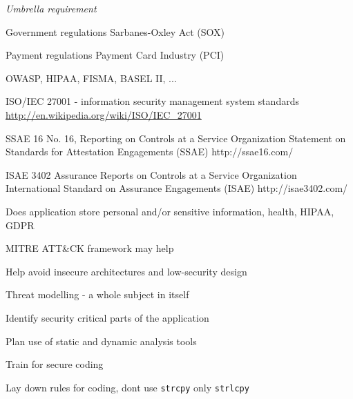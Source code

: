 \documentclass[Screen16to9,17pt]{foils}
\begin{document}
\begin{list2}
\item \emph{Umbrella requirement}
\item Government regulations Sarbanes-Oxley Act (SOX)
\item Payment regulations Payment Card Industry (PCI)
\item OWASP, HIPAA, FISMA, BASEL II, ...
\item ISO/IEC 27001 - information security management system standards
\url{http://en.wikipedia.org/wiki/ISO/IEC_27001}
\item SSAE 16 No. 16, Reporting on Controls at a Service Organization
Statement on Standards for Attestation Engagements (SSAE) http://ssae16.com/
\item ISAE 3402 Assurance Reports on Controls at a Service Organization
International Standard on Assurance Engagements (ISAE) http://isae3402.com/
\end{list2}






\begin{list2}
\item Does application store personal and/or sensitive information, health, HIPAA, GDPR
\item MITRE ATT\&CK framework may help 
\end{list2}


\begin{list2}
\item Help avoid insecure architectures and low-security design
\item Threat modelling - a whole subject in itself
\item Identify security critical parts of the application
\end{list2}


\begin{list2}
\item Plan use of static and dynamic analysis tools
\item Train for secure coding
\item Lay down rules for coding, dont use \verb+strcpy+ only \verb+strlcpy+
\end{list2}
\end{document}
